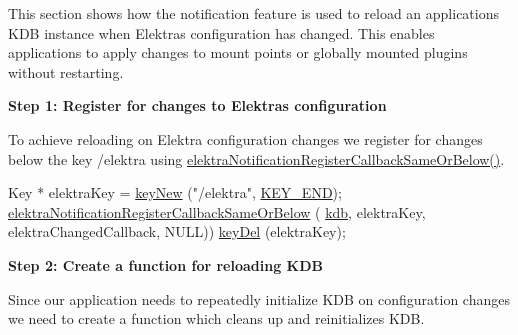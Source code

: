 This section shows how the notification feature is used to reload an application\textquotesingle{}s K\+DB instance when Elektra\textquotesingle{}s configuration has changed. This enables applications to apply changes to mount points or globally mounted plugins without restarting.

{\bfseries Step 1\+: Register for changes to Elektra\textquotesingle{}s configuration}

To achieve reloading on Elektra configuration changes we register for changes below the key {\ttfamily /elektra} using {\ttfamily \hyperlink{group__kdbnotification_ga374edd4f4fff527d6511ce4d0df62681}{elektra\+Notification\+Register\+Callback\+Same\+Or\+Below()}}.


\begin{DoxyCode}
Key * elektraKey = \hyperlink{group__key_gad23c65b44bf48d773759e1f9a4d43b89}{keyNew} (\textcolor{stringliteral}{"/elektra"}, \hyperlink{group__key_gga91fb3178848bd682000958089abbaf40aa8adb6fcb92dec58fb19410eacfdd403}{KEY\_END});
\hyperlink{group__kdbnotification_ga374edd4f4fff527d6511ce4d0df62681}{elektraNotificationRegisterCallbackSameOrBelow} (
      \hyperlink{namespacekdb}{kdb}, elektraKey, elektraChangedCallback, NULL))
\hyperlink{group__key_ga3df95bbc2494e3e6703ece5639be5bb1}{keyDel} (elektraKey);
\end{DoxyCode}


{\bfseries Step 2\+: Create a function for reloading K\+DB}

Since our application needs to repeatedly initialize K\+DB on configuration changes we need to create a function which cleans up and reinitializes K\+DB.


